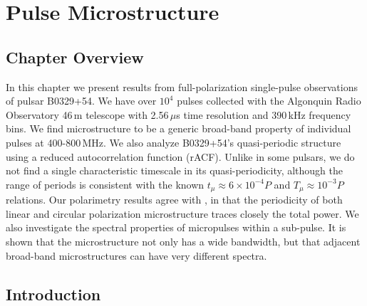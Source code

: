 \chapter{Pulse Microstructure}
\label{chapter:microstructure}



\section{Chapter Overview}
In this chapter we present results from full-polarization  
single-pulse observations of pulsar B0329+54. 
We have over $10^4$ pulses 
collected with the Algonquin Radio Observatory 46\,m telescope
with 2.56\,$\mu$s time resolution and 390\,kHz 
frequency bins. 
We find microstructure to be a generic broad-band property of 
individual pulses at 400-800\,MHz. 
We also analyze B0329+54's quasi-periodic structure
using a reduced autocorrelation function (rACF). 
Unlike in some pulsars, 
we do not find a single characteristic timescale in its quasi-periodicity, 
although the range of periods is consistent with the known
$t_{\mu} \approx 6 \times 10^{-4} P$ and 
$T_{\mu} \approx 10^{-3} P$ relations. 
Our polarimetry results agree with 
\citet{2015ApJ...806..236M}, in that the periodicity 
of both linear and circular polarization microstructure 
traces closely the total power. 
We also investigate the spectral properties 
of micropulses within a sub-pulse. It is shown that the microstructure not 
only has a wide bandwidth, but that adjacent broad-band 
microstructures can have very different spectra. 


\section{Introduction}

